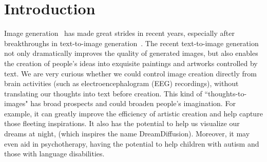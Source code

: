 \documentclass[10pt,twocolumn,letterpaper]{article}
\begin{document}
\begin{abstract}
This paper introduces DreamDiffusion, a novel method for generating high-quality images directly from brain electroencephalogram (EEG) signals, without the need to translate thoughts into text. DreamDiffusion leverages pre-trained text-to-image models and employs temporal masked signal modeling to pre-train the EEG encoder for effective and robust EEG representations. Additionally, the method further leverages the CLIP image encoder to provide extra supervision to better align EEG, text, and image embeddings with limited EEG-image pairs. Overall, the proposed method overcomes the challenges of using EEG signals for image generation, such as noise, limited information, and individual differences, and achieves promising results. Quantitative and qualitative results demonstrate the effectiveness of the proposed method as a significant step towards portable and low-cost ``thoughts-to-image'', with potential applications in neuroscience and computer vision. The code is available here \url{https://github.com/bbaaii/DreamDiffusion}.
\end{abstract}

\section{Introduction}

Image generation~\cite{goodfellow2020generative,karras2019style,brock2018large} has made great strides in recent years, especially after breakthroughs in text-to-image generation~\cite{ramesh2021zero,ding2022cogview2,ramesh2022hierarchical,saharia2022photorealistic,bai2023textir}. The recent text-to-image generation not only dramatically improves the quality of generated images, but also enables the creation of people's ideas into exquisite paintings and artworks controlled by text.
%
We are very curious whether we could control image creation directly from brain activities (such as electroencephalogram (EEG) recordings), without translating our thoughts into text before creation.
%
This kind of ``thoughts-to-images" has broad prospects and could broaden people's imagination. 
For example, it can greatly improve the efficiency of artistic creation and help capture those fleeting inspirations. It also has the potential to help us visualize our dreams at night, (which inspires the name DreamDiffusion). Moreover, it may even aid in psychotherapy, having the potential to help children with autism and those with language disabilities.
\end{document}
